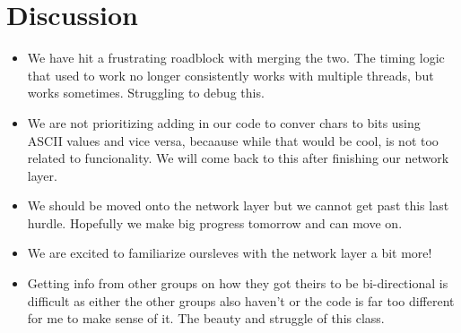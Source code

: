 \documentclass{article}
\begin{document}
\section*{Discussion}
\begin{itemize}
\item We have hit a  frustrating roadblock with merging the two. The timing logic that used to work no longer consistently works with multiple threads, but works sometimes. Struggling to debug this.
\item We are not prioritizing adding in our code to conver chars to bits using ASCII values and vice versa, becaause while that would be cool, is not too related to funcionality. We will come back to this after finishing our network layer. 
\item We should be moved onto the network layer but we cannot get past this last hurdle. Hopefully we make big progress tomorrow and can move on. 
\item We are excited to familiarize oursleves with the network layer a bit more!
\item Getting info from other groups on how they got theirs to be bi-directional is difficult as either the other groups also haven't or the code is far too different for me to make sense of it. The beauty and struggle of this class.
\end{itemize}
\end{document}
